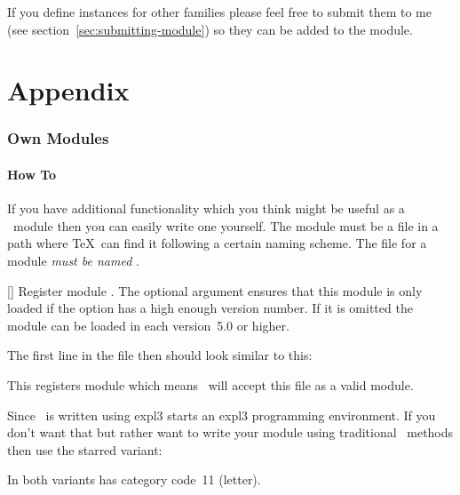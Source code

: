 \documentclass{chemmacros-manual}
\begin{document}
If you define instances for other families please feel free to submit them to
me (see section~\vref{sec:submitting-module}) so they can be added to the
 module.

\appendix
\part{Appendix}
\section{Own Modules}\label{sec:own-modules}
\subsection{How To}

If you have additional functionality which you think might be useful as a
\chemmacros\ module then you can easily write one yourself.  The module must
be a file in a path where \TeX\ can find it following a certain naming
scheme.  The file for a module  \emph{must be named}
.

\begin{commands}
  [\sarg{}]
    Register module .  The optional argument  ensures that this module is only loaded if the
    option  has a high enough version number.  If it is
    omitted the module can be loaded in each version~5.0 or higher.
\end{commands}

The first line in the file then should look similar to this:
\begin{sourcecode}
\end{sourcecode}
This registers module  which means \chemmacros\ will accept
this file as a valid module.

Since \chemmacros\ is written using expl3  starts an expl3
programming environment.  If you don't want that but rather want to write your
module using traditional \LaTeXe\ methods then use the starred variant:
\begin{sourcecode}
\end{sourcecode}
In both variants  has category code~11 (letter).
\end{document}
